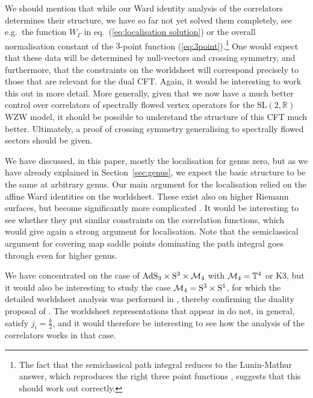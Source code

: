 \documentclass[12pt,a4paper]{article}
\begin{document}
We should mention that while our Ward identity analysis of the correlators determines their structure, we have so far not yet solved them completely, see e.g.\ the function $W_\Gamma$ in eq.~(\ref{eq:localisation solution}) or the overall normalisation constant of the $3$-point function (\ref{eq:3point}).\footnote{The fact that the semiclassical path integral reduces to the Lunin-Mathur answer, which reproduces the right three point functions \cite{Lunin:2000yv, Lunin:2001pw}, suggests that this should work out correctly.} One would expect that these data will be  determined by null-vectors and crossing symmetry, and furthermore, that the constraints on the worldsheet will correspond precisely to those that are relevant for the dual CFT. Again, it would be interesting to work this out in more detail. More generally, given that we now have a much better control over correlators of spectrally flowed vertex operators for the $\mathrm{SL}(2,\mathds{R})$ WZW model, it should  be possible to understand the structure of this CFT much better. Ultimately, a proof of crossing symmetry generalising \cite{Teschner:2001gi} to spectrally flowed sectors should be given. 

We have discussed, in this paper, mostly the localisation for genus zero, but as we have already explained in Section~\ref{sec:genus}, we expect the basic structure to be the same at arbitrary genus. Our main argument for the localisation relied on the affine Ward identities on the worldsheet. These exist also on higher Riemann surfaces, but become significantly more complicated \cite{Eguchi:1986sb, Bernard:1988yv}. It would be interesting to see whether they put similar constraints on the correlation functions, which would give again a strong argument for localisation. Note that the semiclassical argument for covering map saddle points dominating the path integral goes through even for higher genus.  

We have concentrated on the case of ${\rm AdS}_3\times {\rm S}^3 \times {\cal M}_4$ with ${\cal M}_4 = \mathbb{T}^4$ or K3, but it would also be interesting to study the case ${\cal M}_4 = {\rm S}^3 \times {\rm S}^1$, for which the detailed worldsheet analysis was performed in \cite{Eberhardt:2019niq}, thereby confirming the duality proposal of \cite{Eberhardt:2017pty}. The worldsheet representations that appear in \cite{Eberhardt:2019niq} do not, in general, satisfy $j_i=\frac{k}{2}$, and it would therefore be interesting to see how the analysis of the correlators works in that case. 
\end{document}

